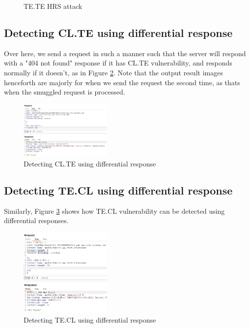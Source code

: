\documentclass[conference]{IEEEtran}
\begin{document}
\begin{figure}[htbp]
\begin{minipage}[c]{0.45\linewidth}
	  \captionsetup{justification=centering}
	  \caption*{Req-2: Smuggling \\ successful}
	  \label{fig:te.te_req2_gpost}
	\end{minipage}
  
	\caption{TE.TE HRS attack}
	\label{fig:te.te}
\end{figure}

\subsection*{Detecting CL.TE using differential response}
Over here, we send a request in such a manner such that the server will respond with a "404 not found" response if it has CL.TE vulnerability, and responds normally if it doesn't, as in Figure \ref*{fig:ce.te.detection}. Note that the output result images henceforth are majorly for when we send the request the second time, as thats when the smuggled request is processed.

\begin{figure}[htbp]
	\centering
	\includegraphics[width=0.4\textwidth]{results/Detecting_CL.TE.jpeg}
	\caption{Detecting CL.TE using differential response}
	\label{fig:ce.te.detection}
\end{figure}

\subsection*{Detecting TE.CL using differential response}
Similarly, Figure \ref*{fig:te.cl.detection} shows how TE.CL vulnerability can be detected using differential responses.

\begin{figure}[htbp]
	\centering
	\includegraphics[width=0.4\textwidth]{results/Detecting_TE.CL.jpeg}
	\caption{Detecting TE.CL using differential response}
	\label{fig:te.cl.detection}
\end{figure}
\end{document}

